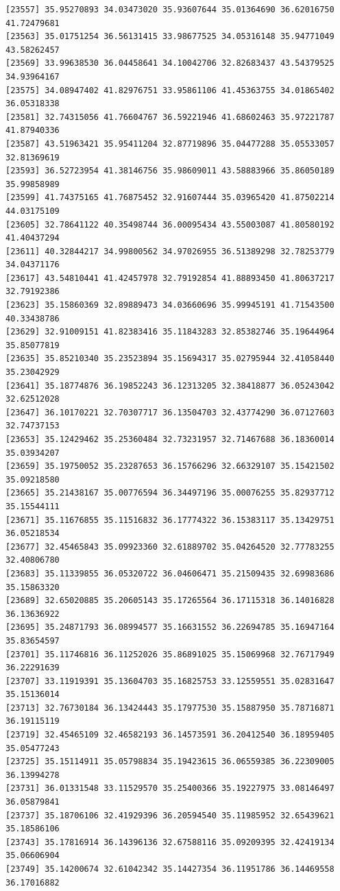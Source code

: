\documentclass[
  letterpaper,
  DIV=11,
  numbers=noendperiod]{scrartcl}
\begin{document}
\begin{verbatim}
[23557] 35.95270893 34.03473020 35.93607644 35.01364690 36.62016750 41.72479681
[23563] 35.01751254 36.56131415 33.98677525 34.05316148 35.94771049 43.58262457
[23569] 33.99638530 36.04458641 34.10042706 32.82683437 43.54379525 34.93964167
[23575] 34.08947402 41.82976751 33.95861106 41.45363755 34.01865402 36.05318338
[23581] 32.74315056 41.76604767 36.59221946 41.68602463 35.97221787 41.87940336
[23587] 43.51963421 35.95411204 32.87719896 35.04477288 35.05533057 32.81369619
[23593] 36.52723954 41.38146756 35.98609011 43.58883966 35.86050189 35.99858989
[23599] 41.74375165 41.76875452 32.91607444 35.03965420 41.87502214 44.03175109
[23605] 32.78641122 40.35498744 36.00095434 43.55003087 41.80580192 41.40437294
[23611] 40.32844217 34.99800562 34.97026955 36.51389298 32.78253779 34.04371176
[23617] 43.54810441 41.42457978 32.79192854 41.88893450 41.80637217 32.79192386
[23623] 35.15860369 32.89889473 34.03660696 35.99945191 41.71543500 40.33438786
[23629] 32.91009151 41.82383416 35.11843283 32.85382746 35.19644964 35.85077819
[23635] 35.85210340 35.23523894 35.15694317 35.02795944 32.41058440 35.23042929
[23641] 35.18774876 36.19852243 36.12313205 32.38418877 36.05243042 32.62512028
[23647] 36.10170221 32.70307717 36.13504703 32.43774290 36.07127603 32.74737153
[23653] 35.12429462 35.25360484 32.73231957 32.71467688 36.18360014 35.03934207
[23659] 35.19750052 35.23287653 36.15766296 32.66329107 35.15421502 35.09218580
[23665] 35.21438167 35.00776594 36.34497196 35.00076255 35.82937712 35.15544111
[23671] 35.11676855 35.11516832 36.17774322 36.15383117 35.13429751 36.05218534
[23677] 32.45465843 35.09923360 32.61889702 35.04264520 32.77783255 32.40806780
[23683] 35.11339855 36.05320722 36.04606471 35.21509435 32.69983686 35.15863320
[23689] 32.65020885 35.20605143 35.17265564 36.17115318 36.14016828 36.13636922
[23695] 35.24871793 36.08994577 35.16631552 36.22694785 35.16947164 35.83654597
[23701] 35.11746816 36.11252026 35.86891025 35.15069968 32.76717949 36.22291639
[23707] 33.11919391 35.13604703 35.16825753 33.12559551 35.02831647 35.15136014
[23713] 32.76730184 36.13424443 35.17977530 35.15887950 35.78716871 36.19115119
[23719] 32.45465109 32.46582193 36.14573591 36.20412540 36.18959405 35.05477243
[23725] 35.15114911 35.05798834 35.19423615 36.06559385 36.22309005 36.13994278
[23731] 36.01331548 33.11529570 35.25400366 35.19227975 33.08146497 36.05879841
[23737] 35.18706106 32.41929396 36.20594540 35.11985952 32.65439621 35.18586106
[23743] 35.17816914 36.14396136 32.67588116 35.09209395 32.42419134 35.06606904
[23749] 35.14200674 32.61042342 35.14427354 36.11951786 36.14469558 36.17016882

\end{verbatim}
\end{document}
